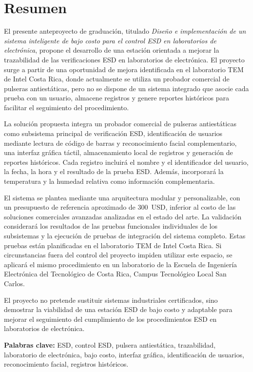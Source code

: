 \chapter*{Resumen}

El presente anteproyecto de graduación, titulado \textit{Diseño e implementación
de un sistema inteligente de bajo costo para el control ESD en laboratorios de
electrónica}, propone el desarrollo de una estación orientada a mejorar la
trazabilidad de las verificaciones ESD en laboratorios de electrónica. El
proyecto surge a partir de una oportunidad de mejora identificada en el
laboratorio TEM de Intel Costa Rica, donde actualmente se utiliza un probador
comercial de pulseras antiestáticas, pero no se dispone de un sistema integrado
que asocie cada prueba con un usuario, almacene registros y genere reportes
históricos para facilitar el seguimiento del procedimiento.

La solución propuesta integra un probador comercial de pulseras antiestáticas
como subsistema principal de verificación ESD, identificación de usuarios
mediante lectura de código de barras y reconocimiento facial complementario,
una interfaz gráfica táctil, almacenamiento local de registros y generación de
reportes históricos. Cada registro incluirá el nombre y el identificador del
usuario, la fecha, la hora y el resultado de la prueba ESD. Además, incorporará
la temperatura y la humedad relativa como información complementaria.

El sistema se plantea mediante una arquitectura modular y personalizable, con
un presupuesto de referencia aproximado de 300~USD, inferior al costo de las
soluciones comerciales avanzadas analizadas en el estado del arte. La
validación considerará los resultados de las pruebas funcionales individuales
de los subsistemas y la ejecución de pruebas de integración del sistema
completo. Estas pruebas están planificadas en el laboratorio TEM de Intel Costa
Rica. Si circunstancias fuera del control del proyecto impiden utilizar este
espacio, se aplicará el mismo procedimiento en un laboratorio de la Escuela de
Ingeniería Electrónica del Tecnológico de Costa Rica, Campus Tecnológico Local
San Carlos.

El proyecto no pretende sustituir sistemas industriales certificados, sino
demostrar la viabilidad de una estación ESD de bajo costo y adaptable para
mejorar el seguimiento del cumplimiento de los procedimientos ESD en
laboratorios de electrónica.

\textbf{Palabras clave:} ESD, control ESD, pulsera antiestática, trazabilidad,
laboratorio de electrónica, bajo costo, interfaz gráfica, identificación de
usuarios, reconocimiento facial, registros históricos.


